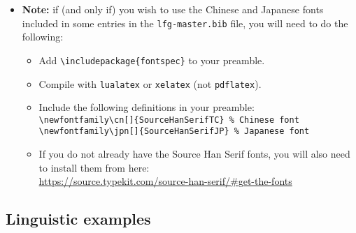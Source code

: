 \documentclass[linguex]{lfg-proc}
\begin{document}
\begin{itemize}
  \item \textbf{Note:} if (and only if) you wish to use the Chinese and Japanese
        fonts included in some entries in the \texttt{lfg-master.bib} file, you
        will need to do the following:
        \begin{itemize}
          \item Add \verb=\includepackage{fontspec}= to your preamble.
          \item Compile with \texttt{lualatex} or \texttt{xelatex} (not \texttt{pdflatex}).
          \item Include the following definitions in your preamble:\\
          \verb=\newfontfamily\cn[]{SourceHanSerifTC} % Chinese font=
          \verb=\newfontfamily\jpn[]{SourceHanSerifJP} % Japanese font=
          \item If you do not already have the Source Han Serif fonts, you will also need to install them from here: \\
          \url{https://source.typekit.com/source-han-serif/#get-the-fonts}
        \end{itemize}
\end{itemize}

\subsection{Linguistic examples}
\end{document}
